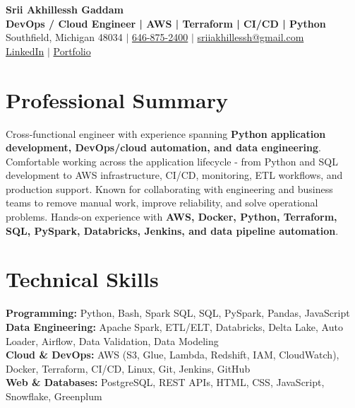 \documentclass[letterpaper,10pt]{article}
\begin{document}
\fontsize{9.35pt}{10.45pt}\selectfont

\begin{center}
    {\LARGE \textbf{Srii Akhillessh Gaddam}} \\[-1pt]
    \textbf{DevOps / Cloud Engineer | AWS | Terraform | CI/CD | Python} \\[2pt]
    Southfield, Michigan 48034 $|$
    \href{tel:6468752400}{646-875-2400} $|$
    \href{mailto:sriiakhillessh@gmail.com}{sriiakhillessh@gmail.com} \\[1pt]
    \href{https://www.linkedin.com/in/srii-akhiilessh-gaddam-b48668191/}{LinkedIn} $|$
    \href{https://sriiakhillesshg.github.io/portfolio/}{Portfolio}
\end{center}
\vspace{-8pt}

\section{Professional Summary}
\small{Cross-functional engineer with experience spanning \textbf{Python application development, DevOps/cloud automation, and data engineering}. Comfortable working across the application lifecycle - from Python and SQL development to AWS infrastructure, CI/CD, monitoring, ETL workflows, and production support. Known for collaborating with engineering and business teams to remove manual work, improve reliability, and solve operational problems. Hands-on experience with \textbf{AWS, Docker, Python, Terraform, SQL, PySpark, Databricks, Jenkins, and data pipeline automation}.}

\section{Technical Skills}
\small{
\textbf{Programming:} Python, Bash, Spark SQL, SQL, PySpark, Pandas, JavaScript \\
\textbf{Data Engineering:} Apache Spark, ETL/ELT, Databricks, Delta Lake, Auto Loader, Airflow, Data Validation, Data Modeling \\
\textbf{Cloud \& DevOps:} AWS (S3, Glue, Lambda, Redshift, IAM, CloudWatch), Docker, Terraform, CI/CD, Linux, Git, Jenkins, GitHub \\
\textbf{Web \& Databases:} PostgreSQL, REST APIs, HTML, CSS, JavaScript, Snowflake, Greenplum
}
\end{document}
